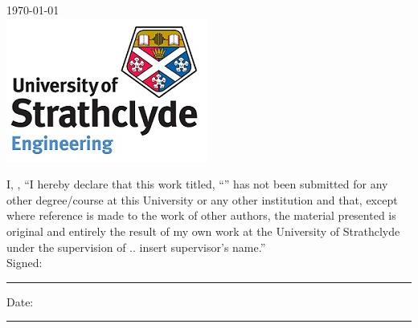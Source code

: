 \documentclass[
11pt, %
english, %
singlespacing, %
headsepline, %
]{MastersDoctoralThesis} %
\begin{document}
\begin{titlepage}
\begin{center}
 {\large \today}\\[1cm] %
 \bigskip
\includegraphics{img/uni_logo_eng.jpg} %
 
\vfill
\end{center}
\end{titlepage}


\begin{declaration}
\addchaptertocentry{\authorshipname}

\bigskip

\noindent I, \authorname, “I hereby declare that this work titled, \enquote{\ttitle} has not been submitted for any other degree/course
at this University or any other institution and that, except where reference is made
to the work of other authors, the material presented is original and entirely the
result of my own work at the University of Strathclyde under the supervision of ..
insert supervisor’s name.”
\\

 
\noindent Signed:\\
\rule[0.5em]{25em}{0.5pt} %
 
\noindent Date:\\
\rule[0.5em]{25em}{0.5pt} %
\end{declaration}
\end{document}
